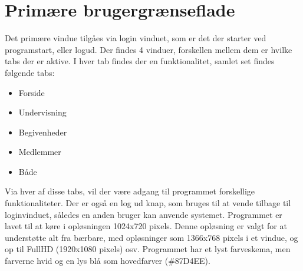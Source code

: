 \section{Primære brugergrænseflade}
Det primære vindue tilgåes via login vinduet, som er det der starter ved programstart, eller logud. 
Der findes 4 vinduer, forskellen mellem dem er hvilke tabs der er aktive. 
I hver tab findes der en funktionalitet, samlet set findes følgende tabs:
\begin{itemize}%
    \item Forside
    \item Undervisning
    \item Begivenheder
    \item Medlemmer
    \item Både
\end{itemize}

Via hver af disse tabs, vil der være adgang til programmet forskellige funktionaliteter.
Der er også en log ud knap, som bruges til at vende tilbage til loginvinduet, således en anden bruger kan anvende systemet.
Programmet er lavet til at køre i opløsningen 1024x720 pixels.
Denne opløsning er valgt for at understøtte alt fra bærbare, med opløsninger som 1366x768 pixels i et vindue, og op til FullHD (1920x1080 pixels) osv.
Programmet har et lyst farveskema, men farverne hvid og en lys blå som hovedfarver (\#87D4EE).



 